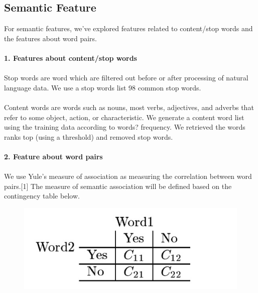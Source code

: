 \subsection{Semantic Feature}
For semantic features, we've explored features related to content/stop words and the features about word pairs.\\\\
\textbf{1. Features about content/stop words} 
\\\\Stop words are word which are filtered out before or after processing of natural language data. We use a stop words list 98 common stop words.\\
\\Content words are words such as nouns, most verbs, adjectives, and adverbs that refer to some object, action, or characteristic. We generate a content word list using the training data according to words? frequency. We retrieved the words ranks top (using a threshold) and removed stop words.\\\\
\textbf{2. Feature about word pairs}
\\\\We use Yule's measure of association as measuring the correlation between word pairs.[1] The measure of semantic association will be defined based on the contingency table below.
\begin{figure}[!h]
\centering  
\includegraphics[width = 0.7\linewidth]{./FIG/030/contigency}\hfill
\label{fig:020feature}
\end{figure}
